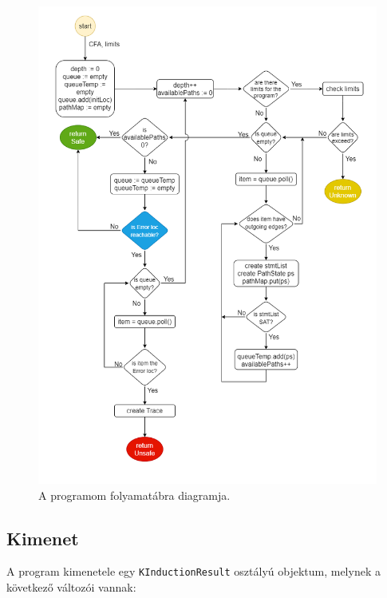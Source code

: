 \begin{figure}[!ht]
	\centering
	\includegraphics[width=150mm, keepaspectratio]{figures/flow_chart_med_res.png}
	\caption[Caption for LOF]{A programom folyamatábra diagramja.}
	\label{fig:state_diagram2}
\end{figure}
\clearpage

\subsection{Kimenet}
A program kimenetele egy \verb+KInductionResult+ osztályú objektum, melynek a következő változói vannak:

